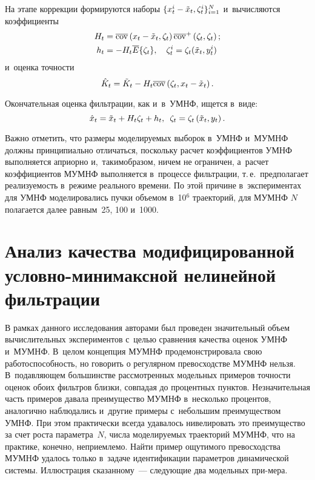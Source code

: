 \begin{multicols}{2}
{}
    
    На этапе коррекции формируются наборы $\{ x_t^i \hm- \tilde{x}_t, 
\zeta_t^i\}^N_{i=1}$ и~вычисляются коэффициенты 
    \begin{align*}
    H_t&= \overline{\mathrm{cov}} \left(x_t\hm- \tilde{x}_t, \zeta_t\right)
    \overline{\mathrm{cov}}^+  \left(\zeta_t, \zeta_t\right);\\ 
    h_t&= -H_t \overline{E}\{\zeta_t\},\quad 
    \zeta_t^i=  \zeta_t(\tilde{x}_t, y_t^i)
   \end{align*}
    и~оценка точ\-ности 
    $$
    \hat{K}_t= \tilde{K}_t- H_t 
\overline{\mathrm{cov}} \left(\zeta_t, x_t\hm- \tilde{x}_t\right).
$$

 Окончательная оценка фильт\-ра\-ции, 
как и~в~УМНФ, ищется в~виде:
$$
\hat{x}_t= \tilde{x}_t+ H_t 
\zeta_t+h_t,\enskip \zeta_t= \zeta_t\left(\tilde{x}_t, y_t\right). 
$$
    
    Важно отметить, что размеры моделируемых выбо\-рок в~УМНФ и~МУМНФ 
должны принципиально отличаться, поскольку расчет коэффициентов УМНФ 
выполняется априорно и,~таким\linebreak образом, ничем не ограничен, а~расчет 
коэффициентов МУМНФ выполняется в~процессе фильт\-ра\-ции, т.\,е.\ 
предполагает реализуемость в~режиме реального времени. По этой причине 
в~экспериментах для УМНФ моделировались пучки объемом в~10$^6$ 
траекторий, для МУМНФ $N$ полагается далее равным~25, 100 и~1000.
    
\section{Анализ качества модифицированной условно-минимаксной нелинейной
фильтрации}

    В рамках данного исследования авторами был проведен значительный 
объем вычислительных экспериментов с~целью сравнения качества оценок 
УМНФ и~МУМНФ. В~целом концепция МУМНФ продемонстрировала свою 
работоспособность, но говорить о регулярном превосходстве МУМНФ нель\-зя. 
В~подавляющем большинстве рассмотренных модельных примеров точности 
оценок обоих фильтров близки, совпадая до процентных пунктов. 
Незначительная часть примеров давала преимущество МУМНФ в~несколько 
процентов, аналогично наблюдались и~другие примеры с~небольшим 
преимуществом УМНФ. При этом практически всегда удавалось нивелировать 
это преимущество за счет роста параметра~$N$, числа моделируемых 
траекторий МУМНФ, что на практике, конечно, неприемлемо. Найти пример 
ощутимого превосходства МУМНФ удалось только в~задаче идентификации
параметров динамической системы. Иллюстрация сказанному~--- следующие 
два модельных при-\linebreak мера.


\end{multicols}
